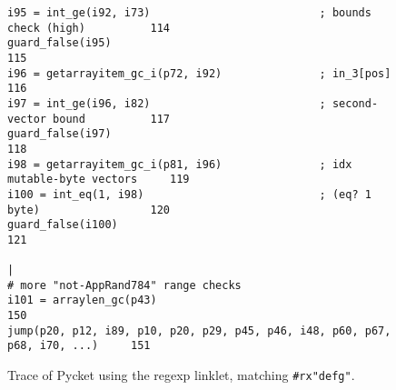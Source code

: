 \begin{figure}[!htbp]
\begin{minipage}{\textwidth}
\begin{lstlisting}[style=rptrace-style]
i95 = int_ge(i92, i73)                          ; bounds check (high)          114
guard_false(i95)                                                               115
i96 = getarrayitem_gc_i(p72, i92)               ; in_3[pos]                    116
i97 = int_ge(i96, i82)                          ; second-vector bound          117
guard_false(i97)                                                               118
i98 = getarrayitem_gc_i(p81, i96)               ; idx mutable-byte vectors     119
i100 = int_eq(1, i98)                           ; (eq? 1 byte)                 120
guard_false(i100)                                                              121
                                                                               |
# more "not-AppRand784" range checks
i101 = arraylen_gc(p43)                                                        150
jump(p20, p12, i89, p10, p20, p29, p45, p46, i48, p60, p67, p68, i70, ...)     151
\end{lstlisting}

	\end{minipage}
\caption{\small Trace of Pycket using the regexp linklet, matching
		{\tt\#rx"defg"}.}
\label{fig:regexp-linklet-big-trace}
\end{figure}